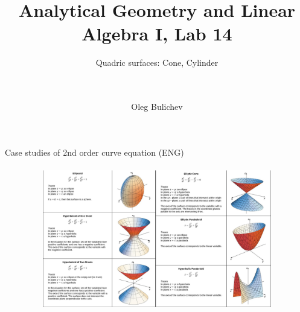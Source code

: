 \documentclass[aspectratio=169]{beamer}
\title[AGLA1]{Analytical Geometry and Linear Algebra I, Lab 14} %
\subtitle{Quadric surfaces: Cone, Cylinder
\\ \    \\ \  
         } %
\author{Oleg Bulichev}
\newcommand{\fbckg}[1]{\usebackgroundtemplate{\texttt{[image: \#1]}}}%
\begin{document}
\setlength{\abovedisplayskip}{0pt}
\setlength{\belowdisplayskip}{0pt}
\setlength{\abovedisplayshortskip}{0pt}
\setlength{\belowdisplayshortskip}{0pt}

\fbckg{fibeamer/figs/title_page.png}

\fbckg{fibeamer/figs/common.png}

\note{\scriptsize \begin{itemize}
    \item \ 
\end{itemize}}


\begin{frame}[t]{Case studies of 2nd order curve equation (ENG)}
\framesubtitle{}
    \vspace{-0.6cm}
    \begin{figure}[H]
        \centering\includegraphics[height=6cm,width=1\textwidth,keepaspectratio]{curve_eq_eng.png}
        \label{fig:curve_eq_eng.png}
    \end{figure}
\end{frame}
\end{document}
